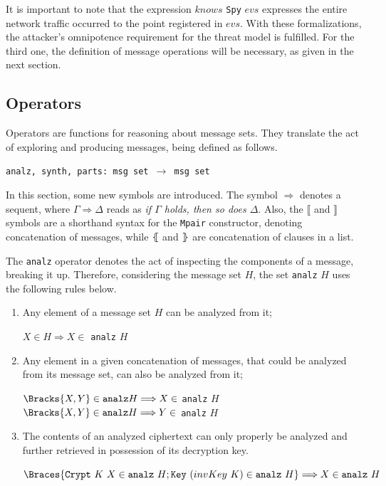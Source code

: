 It is important to note that the expression \(knows\) \texttt{Spy} \(evs\) expresses the entire network traffic occurred to the point registered in \(evs\). With these formalizations, the attacker's omnipotence requirement for the threat model is fulfilled. For the third one, the definition of message operations will be necessary, as given in the next section.



\subsection{Operators}\label{ssec:operators}
Operators are functions for reasoning about message sets. They translate the act of exploring and producing messages, being defined as follows.

\begin{center}
  \texttt{analz, synth, parts: msg set \(\longrightarrow \) msg set}
\end{center}

In this section, some new symbols are introduced. The symbol \(\Longrightarrow \) denotes a sequent, where \(\Gamma \Longrightarrow \Delta \) reads as {\em if \(\Gamma \) holds, then so does \(\Delta \)}. Also, the \(\lBrack \) and \(\rBrack \) symbols are a shorthand syntax for the \texttt{Mpair} constructor, denoting concatenation of messages, while \(\lBrace \) and \(\rBrace \) are concatenation of clauses in a list.

The \texttt{analz} operator denotes the act of inspecting the components of a message, breaking it up. Therefore, considering the message set \(H\), the set \texttt{analz} \(H\) uses the following rules below.

\begin{enumerate}
  \item Any element of a message set \(H\) can be analyzed from it;
  \begin{center}
    \(X \in H \Longrightarrow X \in \) \texttt{analz} \(H\)
  \end{center}

  \item Any element in a given concatenation of messages, that could be analyzed from its message set, can also be analyzed from it;
  \begin{center}
    \(\Bracks{X,Y} \in \texttt{analz} H \Longrightarrow X \in \) \texttt{analz} \(H\) \\
    \(\Bracks{X,Y} \in \texttt{analz} H \Longrightarrow Y \in \) \texttt{analz} \(H\)
  \end{center}

  \item The contents of an analyzed ciphertext can only properly be analyzed and further retrieved in possession of its decryption key.
  \begin{center}
    \(\Braces{\texttt{Crypt}\ K\ X \in \texttt{analz}\ H; \texttt{Key}\ (invKey\ K) \in \texttt{analz}\ H} \Longrightarrow X \in \texttt{analz}\ H\)
  \end{center}
\end{enumerate}

